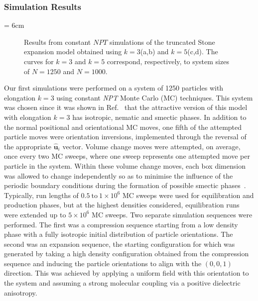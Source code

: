 \documentclass[%
reprint,
superscriptaddress,
showpacs,
 amsmath,amssymb,
 aps,
floatfix,
]{revtex4-1}
\newcommand{\vecth}[1]{ \mathbf{\hat{#1} } }
\newcommand{\picL}[1]{\texttt{[image: \#1]}}
\newlength{\picW}
\begin{document}
\subsubsection{Simulation Results}

\picW = 6cm
\begin{figure*}
    \centering
    \subfigure[$k=3$]{\picL{HP_P-rho_k3.ps}}
    \subfigure[$k=3$]{\picL{HP_P2-rho_k3.ps}}
    \subfigure[$k=5$]{\picL{HP_P-rho_k5.ps}}
    \subfigure[$k=5$]{\picL{HP_P2-rho_k5.ps}}
    \caption{Results from constant $NPT$ simulations of the truncated Stone expansion model obtained using
    $k=3$(a,b) and $k=5$(c,d). The curves for $k=3$ and $k=5$ correspond, respectively, to system sizes
    of $N=1250$ and $N=1000$.}
    \label{fig:HP_phaseDia}
\end{figure*}


Our first simulations were performed on a system of 1250 particles
with elongation $k=3$ using constant {\em NPT} Monte Carlo (MC)
techniques. This system was chosen since it was shown in
Ref.~\cite{Berardi_Ricci_01} that the attractive version of this
model with elongation $k=3$ has isotropic, nematic and smectic
phases. In addition to the normal positional and orientational MC
moves, one fifth of the attempted particle moves were orientation
inversions, implemented through the reversal of the appropriate
$\vecth{u}_i$ vector. Volume change moves were attempted, on
average, once every two MC sweeps, where one sweep represents one
attempted move per particle in the system.
Within these volume
change moves, each box dimension was allowed to change
independently so as to minimise the influence of the periodic
boundary conditions during the formation of possible smectic
phases~\cite{Dominguez_Velasco_02}.
%
Typically, run lengths of $0.5\ \mathrm{to}\ 1 \times 10^6$ MC
sweeps were used for equilibration and production phases, but at the highest densities
considered, equilibration runs were extended up to $5 \times 10^6$ MC sweeps. Two separate
simulation sequences were performed. The first was a compression sequence starting from a low
density phase with a fully isotropic initial distribution of particle orientations. The second
was an expansion sequence, the starting configuration for which was generated by taking a high
density configuration obtained from the compression sequence and inducing the particle
orientations to align with the $(0,0,1)$ direction. This was achieved by applying a uniform
field with this orientation to the system and assuming a strong molecular coupling via a
positive dielectric anisotropy.
\end{document}
